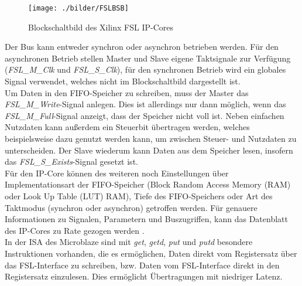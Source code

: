 \begin{figure}[th!]
\centering
\texttt{[image: ./bilder/FSLBSB]}
\caption{Blockschaltbild des Xilinx FSL IP-Cores \cite{FSL_CORE}}
\label{fig:FSLBSB}
\end{figure}
\noindent
Der Bus kann entweder synchron oder asynchron betrieben werden. Für den asynchronen Betrieb stellen Master und Slave eigene Taktsignale zur Verfügung (\textit{FSL\_M\_Clk} und \textit{FSL\_S\_Clk}), für den synchronen Betrieb wird ein globales Signal verwendet, welches nicht im Blockschaltbild dargestellt ist.\\
Um Daten in den FIFO-Speicher zu schreiben, muss der Master das \textit{FSL\_M\_Write}-Signal anlegen. Dies ist allerdings nur dann möglich, wenn das \textit{FSL\_M\_Full}-Signal anzeigt, dass der Speicher nicht voll ist. Neben einfachen Nutzdaten kann außerdem ein Steuerbit übertragen werden, welches beispielsweise dazu genutzt werden kann, um zwischen Steuer- und Nutzdaten zu unterscheiden. Der Slave wiederum kann Daten aus dem Speicher lesen, insofern das \textit{FSL\_S\_Exists}-Signal gesetzt ist.\\
Für den IP-Core können des weiteren noch Einstellungen über Implementationsart der FIFO-Speicher (Block Random Access Memory (RAM) oder Look Up Table (LUT) RAM), Tiefe des FIFO-Speichers oder Art des Taktmodus (synchron oder asynchron) getroffen werden. Für genauere Informationen zu Signalen, Parametern und Buszugriffen, kann das Datenblatt des IP-Cores zu Rate gezogen werden \cite{FSL_CORE}.\\
In der ISA des Microblaze sind mit \textit{get}, \textit{getd}, \textit{put} und \textit{putd} besondere Instruktionen vorhanden, die es ermöglichen, Daten direkt vom Registersatz über das FSL-Interface zu schreiben, bzw. Daten vom FSL-Interface direkt in den Registersatz einzulesen. Dies ermöglicht Übertragungen mit niedriger Latenz.
